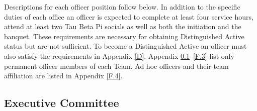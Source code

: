 Descriptions for each officer position follow below. In addition to the specific duties of
each office an officer is expected to complete at least four service hours, attend at least
two Tau Beta Pi socials as well as both the initiation and the banquet. These requirements
are necessary for obtaining Distinguished Active status but are not sufficient. To become
a Distinguished Active an officer must also satisfy the requirements in Appendix \ref{D}. Appendix
\ref{F.1}–\ref{F.3} list only permanent officer members of each Team. Ad hoc officers and their
team affiliation are listed in Appendix \ref{F.4}.


\subsection{Executive Committee} \label{F.1}

